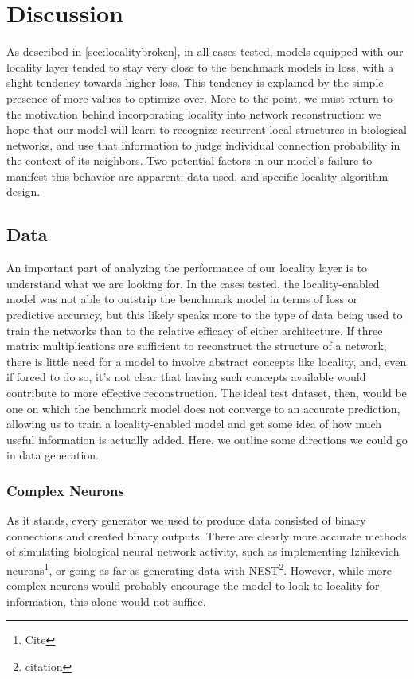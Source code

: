 \chapter{Discussion}
As described in \ref{sec:localitybroken}, in all cases tested, models equipped 
with our locality layer tended to stay very close to the benchmark models in 
loss, with a slight tendency towards higher loss. This tendency is explained by 
the simple presence of more values to optimize over. More to the point, we must 
return to the motivation behind incorporating locality into network 
reconstruction: we hope that our model will learn to recognize recurrent local 
structures in biological networks, and use that information to judge individual 
connection probability in the context of its neighbors. Two potential factors in 
our model's failure to manifest this behavior are apparent: data used, and 
specific locality algorithm design.

\section{Data}
An important part of analyzing the performance of our locality layer is to 
understand what we are looking for. In the cases tested, the locality-enabled 
model was not able to outstrip the benchmark model in terms of loss or 
predictive accuracy, but this likely speaks more to the type of data being used 
to train the networks than to the relative efficacy of either architecture. If 
three matrix multiplications are sufficient to reconstruct the structure of a 
network, there is little need for a model to involve abstract concepts like 
locality, and, even if forced to do so, it's not clear that having such concepts 
available would contribute to more effective reconstruction. The ideal test 
dataset, then, would be one on which the benchmark model does not converge to an 
accurate prediction, allowing us to train a locality-enabled model and get some 
idea of how much useful information is actually added. Here, we outline some 
directions we could go in data generation.

\subsection{Complex Neurons}
As it stands, every generator we used to produce data consisted of binary 
connections and created binary outputs. There are clearly more accurate methods 
of simulating biological neural network activity, such as implementing 
Izhikevich neurons\footnote{Cite}, or going as far as generating data with
NEST\footnote{citation}. However, while more complex neurons would probably 
encourage the model to look to locality for information, this alone would not 
suffice.

